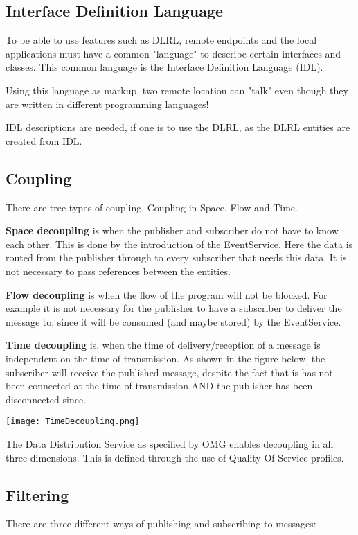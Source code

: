 \subsection{Interface Definition Language}
To be able to use features such as DLRL, remote endpoints and the local applications must have a common "language" to describe certain interfaces and classes. This common language is the Interface Definition Language (IDL).

Using this language as markup, two remote location can "talk" even though they are written in different programming languages!

IDL descriptions are needed, if one is to use the DLRL, as the DLRL entities are created from IDL. 

\subsection{Coupling}
There are tree types of coupling. Coupling in Space, Flow and Time.

\textbf{Space decoupling} is when the publisher and subscriber do not have to know each other. This is done by the introduction of the EventService.  Here the data is routed from the publisher through to every subscriber that needs this data. It is not necessary to pass references between the entities.

\textbf{Flow decoupling} is when the flow of the program will not be blocked. For example it is not necessary for the publisher to have a subscriber to deliver the message to, since it will be consumed (and maybe stored) by the EventService. 

\textbf{Time decoupling} is, when the time of delivery/reception of a message is independent on the time of transmission. As shown in the figure below, the subscriber will receive the published message, despite the fact that is has not been connected at the time of transmission AND the publisher has been disconnected since.

\begin{center}
	\texttt{[image: TimeDecoupling.png]}
\end{center}

The Data Distribution Service as specified by OMG enables decoupling in all three  dimensions. This is defined through the use of Quality Of Service profiles.

\subsection{Filtering}
There are three different ways of publishing and subscribing to messages:

